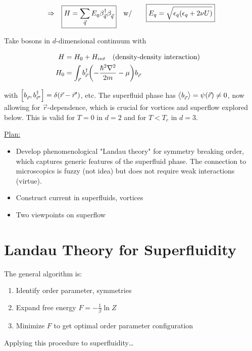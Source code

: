 \documentclass{article}
\newcommand{\egreg}{\vphantom{-}} %
\begin{document}
\begin{align*}
    \Rightarrow \quad \Aboxed{
        H = \sum_{\vec{q}} E_q \beta_{\vec{q}}^{\dagger}\beta_{\vec{q}}^{\egreg}}\qq{w/} \Aboxed{E_q = \sqrt{\epsilon_q\qty(\epsilon_q + 2 \nu U)}}
\end{align*} %



Take bosons in $d$-dimensional continuum with 

\begin{align*}
    H &= H_0 + H_{int} \qq{(density-density interaction)} \\
    H_0 &= \int_{\vec{r}} b_{\vec{r}
    }^{\dagger} \qty(
        - \dfrac{\hbar^2 \nabla^2}{2 m} - \mu
    ) b_{\vec{r}}^{\egreg}
\end{align*}

with $\qty[b_{\vec{r}}^{\egreg}, b_{\vec{r}'}^{\dagger}] = \delta \qty(\vec{r} - \vec{r}')$, etc. The superfluid phase has $\expval{b_{\vec{r}}^{\egreg}} = \psi(\vec{r}) \neq 0$, now allowing for $\vec{r}$-dependence, which is crucial for vortices and superflow explored below. This is valid for $T=0$ in $d=2$ and for $T< T_c$ in $d=3$.

\underline{Plan:}
\begin{itemize}
    \item Develop phenomenological "Landau theory" for symmetry breaking order, which captures generic features of the superfluid phase. The connection to microscopics is fuzzy (not idea) but does not require weak interactions (virtue).
    \item Construct current in superfluids, vortices
    \item Two viewpoints on superflow
\end{itemize}

\section{Landau Theory for Superfluidity}\label{Landau Theory for Superfluidity}

The general algorithm is:
\begin{enumerate}
    \item Identify order parameter, symmetries
    \item Expand free energy $F= -\frac{1}{\beta} \ln{Z}$
    \item Minimize $F$ to get optimal order parameter configuration
\end{enumerate}

Applying this procedure to superfluidity\dots
\end{document}
